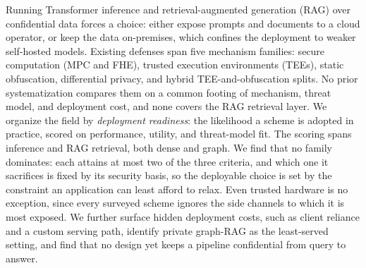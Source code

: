 Running Transformer inference and retrieval-augmented generation (RAG) over confidential data
forces a choice: either expose prompts and documents to a cloud operator, or keep the data
on-premises, which confines the deployment to weaker self-hosted models. Existing defenses span
five mechanism families: secure computation (MPC and FHE), trusted execution environments (TEEs),
static obfuscation,
differential privacy, and hybrid TEE-and-obfuscation splits. No prior systematization compares
them on a common footing of mechanism, threat model, and deployment cost, and none covers the RAG
retrieval layer. We organize the field by \emph{deployment readiness}: the likelihood a scheme is
adopted in practice, scored on performance, utility, and threat-model fit. The scoring spans
inference and RAG retrieval, both dense and graph. We find that no family dominates: each attains at most two of
the three criteria, and which one it sacrifices is fixed by its security basis, so the
deployable choice is set by the constraint an application can least afford to relax. Even trusted hardware is no exception, since
every surveyed scheme ignores the side channels to which it is most exposed. We further surface
hidden deployment costs, such as client reliance and a custom serving path, identify private graph-RAG as
the least-served setting, and find that no design yet keeps a pipeline confidential from query to answer.
